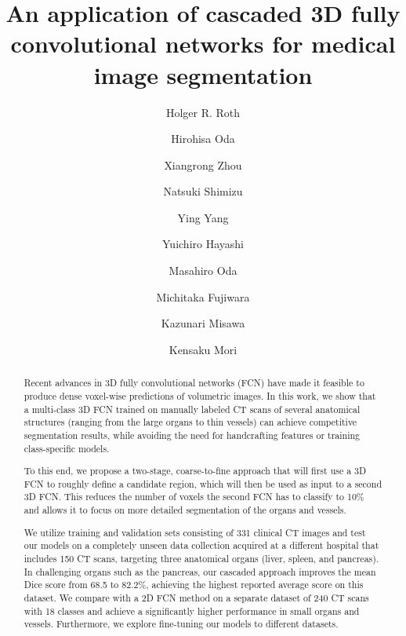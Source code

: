 \documentclass[authoryear]{elsarticle}
\begin{document}
	
\begin{frontmatter}

\title{An application of cascaded 3D fully convolutional networks for medical image segmentation}





\author[a]{Holger R. Roth}
\author[a]{Hirohisa Oda}
\author[b]{Xiangrong Zhou}
\author[a]{Natsuki Shimizu}
\author[a]{Ying Yang}
\author[a]{Yuichiro  Hayashi}
\author[a]{Masahiro Oda}
\author[c]{Michitaka Fujiwara}
\author[d]{Kazunari Misawa}
\author[a]{Kensaku Mori}


\address[a]{Nagoya University, Furo-cho, Chikusa-ku, Nagoya, Japan}
\address[b]{Gifu University, Yanagido, Gifu, Japan}
\address[c]{Nagoya University Graduate School of Medicine, Nagoya, Japan}
\address[d]{Aichi Cancer Center, Kanokoden, Chikusa-ku, Nagoya, Japan}

\begin{abstract}
Recent advances in 3D fully convolutional networks (FCN) have made it feasible to produce dense voxel-wise predictions of volumetric images. In this work, we show that a multi-class 3D FCN trained on manually labeled CT scans of several anatomical structures (ranging from the large organs to thin vessels) can achieve competitive segmentation results, while avoiding the need for handcrafting features or training class-specific models. 	
	
To this end, we propose a two-stage, coarse-to-fine approach that will first use a 3D FCN to roughly define a candidate region, which will then be used as input to a second 3D FCN. This reduces the number of voxels the second FCN has to classify to 10\% and allows it to focus on more detailed segmentation of the organs and vessels. 
	
We utilize training and validation sets consisting of 331 clinical CT images and test our models on a completely unseen data collection acquired at a different hospital that includes 150 CT scans, targeting three anatomical organs (liver, spleen, and pancreas). In challenging organs such as the pancreas, our cascaded approach improves the mean Dice score from 68.5 to 82.2\%, achieving the highest reported average score on this dataset. We compare with a 2D FCN method on a separate dataset of 240 CT scans with 18 classes and achieve a significantly higher performance in small organs and vessels. Furthermore, we explore fine-tuning our models to different datasets.
	

\end{abstract}
\end{frontmatter}
\end{document}

